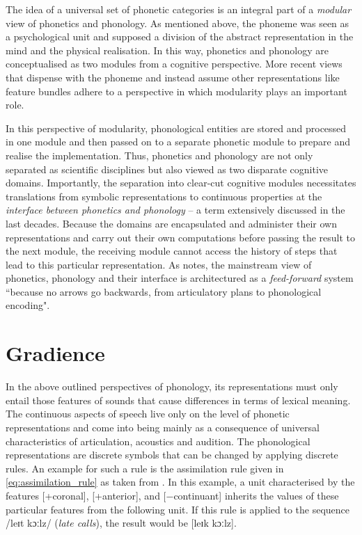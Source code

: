 The idea of a universal set of phonetic categories is an integral part of a \emph{modular} view of phonetics and phonology. As mentioned above, the phoneme was seen as a psychological unit and supposed a division of the abstract representation in the mind and the physical realisation. In this way, phonetics and phonology are conceptualised as two modules from a cognitive perspective. More recent views that dispense with the phoneme and instead assume other representations like feature bundles adhere to a perspective in which modularity plays an important role.

In this perspective of modularity, phonological entities are stored and processed in one module and then passed on to a separate phonetic module to prepare and realise the implementation. Thus, phonetics and phonology are not only separated as scientific disciplines but also viewed as two disparate cognitive domains. Importantly, the separation into clear-cut cognitive modules necessitates translations from symbolic representations to continuous properties \citep{Ohala1990,GafosBenus2006} at the \emph{interface between phonetics and phonology} \citep{Keating1988} -- a term extensively discussed in the last decades. Because the domains are encapsulated and administer their own representations and carry out their own computations before passing the result to the next module, the receiving module cannot access the history of steps that lead to this particular representation. As  \citet[102]{Pierrehumbert2002} notes, the mainstream view of phonetics, phonology and their interface is architectured as a \emph{feed-forward} system ``because no arrows go backwards, from articulatory plans to phonological encoding".

\section{Gradience}
In the above outlined perspectives of phonology, its representations must only entail those features of sounds that cause differences in terms of lexical meaning. The continuous aspects of speech live only on the level of phonetic representations and come into being mainly as a consequence of universal characteristics of articulation, acoustics and audition. The phonological representations are discrete symbols that can be changed by applying discrete rules. An example for such a rule is the assimilation rule given in \ref{eq:assimilation_rule} as taken from \citet[262]{Nolan1992}. In this example, a unit characterised by the features [+coronal], [+anterior], and [$-$continuant] inherits the values of these particular features from the following unit. If this rule is applied to the sequence /leɪt kɔːlz/ (\emph{late calls}), the result would be [leɪk kɔːlz]. 

